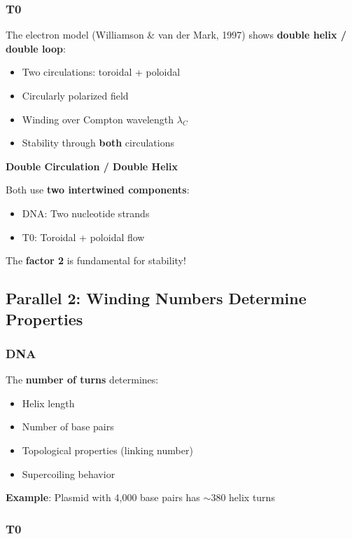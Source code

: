 	\subsubsection{T0}
	
	The electron model (Williamson \& van der Mark, 1997) shows \textbf{double helix / double loop}:
	\begin{itemize}
		\item Two circulations: toroidal + poloidal
		\item Circularly polarized field
		\item Winding over Compton wavelength $\lambda_C$
		\item Stability through \textbf{both} circulations
	\end{itemize}
	
	\begin{keyresult}
		\textbf{Double Circulation / Double Helix}
		
		Both use \textbf{two intertwined components}:
		\begin{itemize}
			\item DNA: Two nucleotide strands
			\item T0: Toroidal + poloidal flow
		\end{itemize}
		
		The \textbf{factor 2} is fundamental for stability!
	\end{keyresult}
	
	\subsection{Parallel 2: Winding Numbers Determine Properties}
	
	\subsubsection{DNA}
	
	The \textbf{number of turns} determines:
	\begin{itemize}
		\item Helix length
		\item Number of base pairs
		\item Topological properties (linking number)
		\item Supercoiling behavior
	\end{itemize}
	
	\textbf{Example}: Plasmid with 4,000 base pairs has $\sim$380 helix turns
	
	\subsubsection{T0}
	
